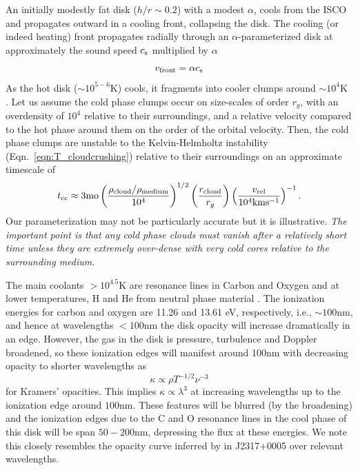 \documentclass[a4paper,fleqn,usenatbib]{mnras}
\begin{document}
{An initially modestly fat disk ($h/r \sim 0.2$) with a modest
$\alpha$, cools from the ISCO and propagates outward in a cooling
front, collapsing the disk. The cooling (or indeed heating) front
propagates radially through an $\alpha$-parameterized disk at
approximately the sound speed $c_{\rm s}$ multiplied by $\alpha$
\citep[e.g., Eqn. 20 from][]{Hameury2009}  
\begin{equation}
v_{\rm front} = \alpha  c_{\rm s} 
\end{equation}
As the hot disk ($\sim 10^{5-6}$K) cools, it
fragments into cooler clumps around $\sim 10^{4}$K \citep[see e.g.,
][]{McCourt2016}.  
Let us assume the cold phase clumps occur on size-scales of order
$r_g$, with an overdensity of $10^{4}$ relative to their surroundings,
and a relative velocity compared to the hot phase around them on the
order of the orbital velocity. Then, the cold phase clumps are
unstable to the Kelvin-Helmholtz instability
(Eqn.~\ref{eqn:T_cloudcrushing}) relative to their surroundings on an
approximate timescale of
\begin{equation}
t_{{\rm cc}} \approx 3{\rm mo} 
               \left( \frac{\rho_{\rm{cloud}}/\rho_{\rm{medium}}}{10^{4}}   \right)^{1/2}
               \left( \frac{r_{\rm cloud}}{r_{g}}\right) 
              \left( \frac{v_{\rm rel}}{10^{4}\rm{km s^{-1}}} \right)^{-1}.
\end{equation}
Our parameterization may not be particularly accurate but it is
illustrative. {\it The important point is that any cold phase clouds
must vanish after a relatively short time unless they are extremely
over-dense with very cold cores relative to the surrounding
medium.} 
}

The main coolants $>10^{4.5}$K are resonance lines
in Carbon and Oxygen and at lower temperatures, H and He from neutral
phase material \citep[see e.g., Fig. 18 in
][]{Sutherland_Dopita1993}. The ionization energies for carbon and
oxygen are 11.26 and 13.61 eV, respectively, i.e., $\sim 100$nm, and
hence at wavelengths $<100$nm the disk opacity will increase
dramatically in an edge.  However, the gas in the disk is pressure,
turbulence and Doppler broadened, so these ionization edges will
manifest around 100nm with decreasing opacity to shorter wavelengths
as
\begin{equation}
  \kappa \propto \rho T^{-1/2} \nu^{-3}
\end{equation}
for Kramers' opacities. This implies $\kappa \propto \lambda^{3}$
at increasing wavelengths up to the ionization edge around $100$nm.
These features will be blurred (by the broadening) and the ionization 
edges due to the C and O resonance lines in the cool phase of this
disk will be span $50-200$nm, depressing the flux at these energies. 
We note this closely resembles the opacity curve inferred by \citet{Guo2016} 
in J2317+0005 over relevant wavelengths.
\end{document}
